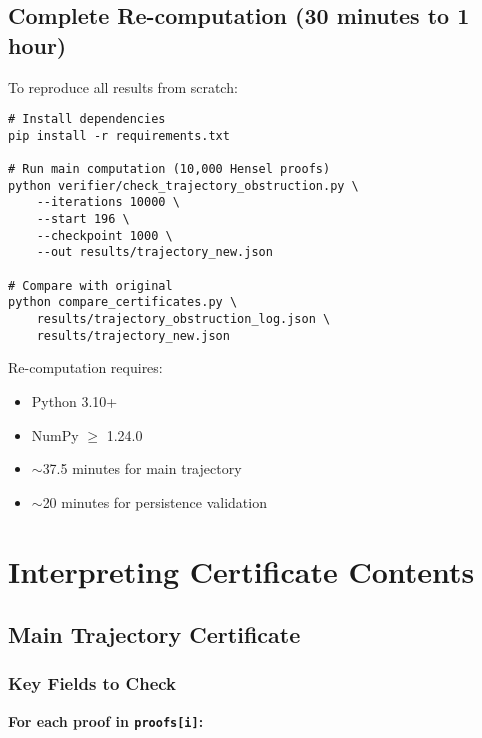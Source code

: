 \documentclass[11pt,a4paper]{article}
\theoremstyle{definition}
\newcommand{\code}[1]{\texttt{#1}}
\begin{document}
\subsection{Complete Re-computation (30 minutes to 1 hour)}

To reproduce all results from scratch:

\begin{lstlisting}[style=bashstyle]
# Install dependencies
pip install -r requirements.txt

# Run main computation (10,000 Hensel proofs)
python verifier/check_trajectory_obstruction.py \
    --iterations 10000 \
    --start 196 \
    --checkpoint 1000 \
    --out results/trajectory_new.json

# Compare with original
python compare_certificates.py \
    results/trajectory_obstruction_log.json \
    results/trajectory_new.json
\end{lstlisting}

\begin{warningbox}[title={Computational Requirements}]
Re-computation requires:
\begin{itemize}
    \item Python 3.10+
    \item NumPy $\geq$ 1.24.0
    \item $\sim$37.5 minutes for main trajectory
    \item $\sim$20 minutes for persistence validation
\end{itemize}
\end{warningbox}

\section{Interpreting Certificate Contents}

\subsection{Main Trajectory Certificate}

\subsubsection{Key Fields to Check}

\textbf{For each proof in \code{proofs[i]}:}
\end{document}

